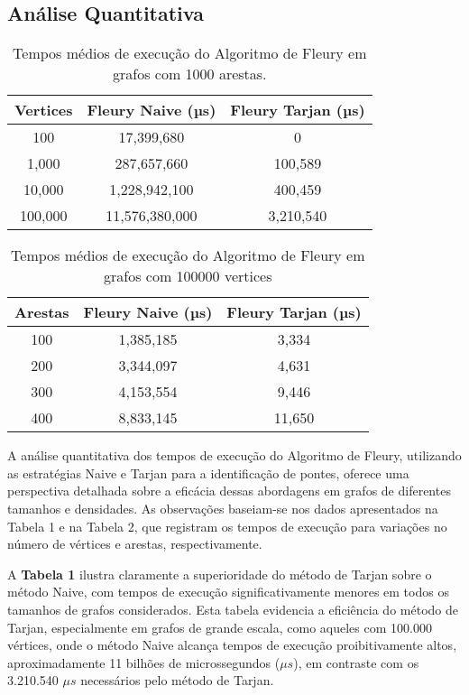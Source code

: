 \documentclass[12pt]{article}
\begin{document}
\subsection{Análise Quantitativa}
\vspace{0.5cm} 
\begin{table}[H]
\centering
\begin{tabular}{|c|c|c|}
\hline
Vertices & Fleury Naive (µs) & Fleury Tarjan (µs) \\ \hline
100      & 17,399,680        & 0                  \\ \hline
1,000    & 287,657,660       & 100,589            \\ \hline
10,000   & 1,228,942,100     & 400,459            \\ \hline
100,000  & 11,576,380,000    & 3,210,540          \\ \hline
\end{tabular}
\caption{Tempos médios de execução do Algoritmo de Fleury em grafos com 1000 arestas.}
\end{table}


\vspace{0.5cm} 
\begin{table}[H]
\centering
\begin{tabular}{|c|c|c|}
\hline
Arestas & Fleury Naive (µs) & Fleury Tarjan (µs) \\ \hline
100      & 1,385,185         & 3,334              \\ \hline
200      & 3,344,097         & 4,631              \\ \hline
300      & 4,153,554         & 9,446              \\ \hline
400      & 8,833,145         & 11,650             \\ \hline
\end{tabular}
\caption{Tempos médios de execução do Algoritmo de Fleury em grafos com 100000 vertices}
\label{tab:average_time}
\end{table}

A análise quantitativa dos tempos de execução do Algoritmo de Fleury, utilizando as estratégias Naive e Tarjan para a identificação de pontes, oferece uma perspectiva detalhada sobre a eficácia dessas abordagens em grafos de diferentes tamanhos e densidades. As observações baseiam-se nos dados apresentados na Tabela 1 e na Tabela 2, que registram os tempos de execução para variações no número de vértices e arestas, respectivamente.

A \textbf{Tabela 1} ilustra claramente a superioridade do método de Tarjan sobre o método Naive, com tempos de execução significativamente menores em todos os tamanhos de grafos considerados. Esta tabela evidencia a eficiência do método de Tarjan, especialmente em grafos de grande escala, como aqueles com 100.000 vértices, onde o método Naive alcança tempos de execução proibitivamente altos, aproximadamente 11 bilhões de microssegundos (\(\mu s\)), em contraste com os 3.210.540 \(\mu s\) necessários pelo método de Tarjan.
\end{document}
